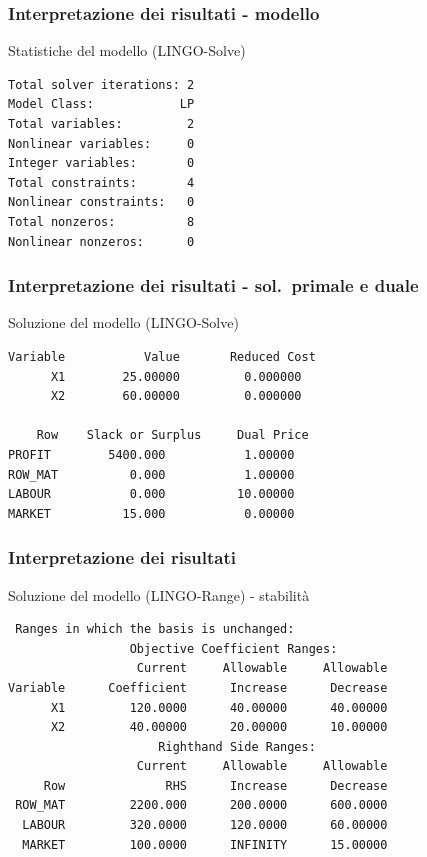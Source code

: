 \documentclass{beamer}
\def\lyxframeend{} %
\begin{document}
\lyxframeend{}

\begin{frame}[fragile]
\frametitle{Interpretazione dei risultati - modello}

{Statistiche del modello (LINGO-Solve)}

\begin{verbatim}
Total solver iterations: 2
Model Class:            LP
Total variables:         2
Nonlinear variables:     0
Integer variables:       0
Total constraints:       4
Nonlinear constraints:   0
Total nonzeros:          8
Nonlinear nonzeros:      0
\end{verbatim}
\end{frame}

\begin{frame}[fragile]
\frametitle{Interpretazione dei risultati - sol.\ primale e duale}

{Soluzione del modello (LINGO-Solve)}

\begin{verbatim}
Variable           Value       Reduced Cost
      X1        25.00000         0.000000
      X2        60.00000         0.000000

    Row    Slack or Surplus     Dual Price
PROFIT        5400.000           1.00000
ROW_MAT          0.000           1.00000
LABOUR           0.000          10.00000
MARKET          15.000           0.00000
\end{verbatim}
\end{frame}



\begin{frame}[fragile]
\frametitle{Interpretazione dei risultati}

{Soluzione del modello (LINGO-Range) - stabilit\`a}

\small\begin{verbatim}
 Ranges in which the basis is unchanged:
                 Objective Coefficient Ranges:
                  Current     Allowable     Allowable
Variable      Coefficient      Increase      Decrease
      X1         120.0000      40.00000      40.00000
      X2         40.00000      20.00000      10.00000
                     Righthand Side Ranges:
                  Current     Allowable     Allowable
     Row              RHS      Increase      Decrease
 ROW_MAT         2200.000      200.0000      600.0000
  LABOUR         320.0000      120.0000      60.00000
  MARKET         100.0000      INFINITY      15.00000
\end{verbatim}
\end{frame}
\end{document}
